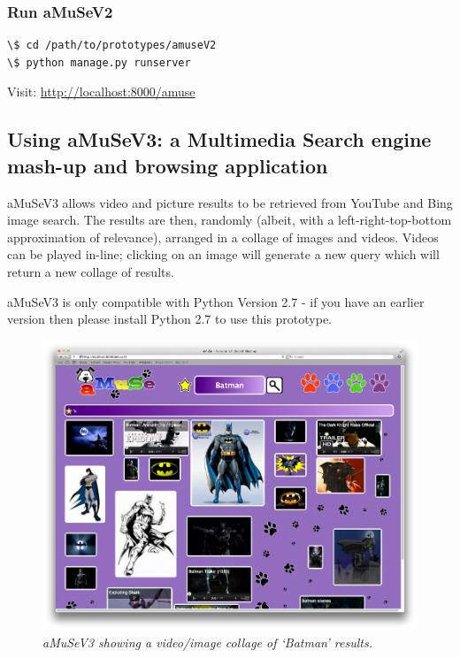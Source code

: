 \documentclass[letterpaper,10pt,english]{sphinxmanual}
\begin{document}
\subsubsection{Run aMuSeV2}
\label{prototypes:run-amusev2}
\begin{Verbatim}[commandchars=\\\{\}]
\$ cd /path/to/prototypes/amuseV2
\$ python manage.py runserver
\end{Verbatim}

Visit: \href{http://localhost:8000/amuse}{http://localhost:8000/amuse}


\subsection{Using aMuSeV3: a Multimedia Search engine mash-up and browsing application}
\label{prototypes:using-amusev3-a-multimedia-search-engine-mash-up-and-browsing-application}
aMuSeV3 allows video and picture results to be retrieved from YouTube and Bing image search. The results are then, randomly (albeit, with a left-right-top-bottom approximation of relevance), arranged in a collage of images and videos. Videos can be played in-line; clicking on an image will generate a new query which will return a new collage of results.

aMuSeV3 is only compatible with Python Version 2.7 - if you have an earlier version then please install Python 2.7 to use this prototype.
\begin{figure}[htbp]
\centering
\capstart

\includegraphics{puppy-amuseV3.png}
\caption{\emph{aMuSeV3 showing a video/image collage of `Batman' results.}}\end{figure}
\end{document}
